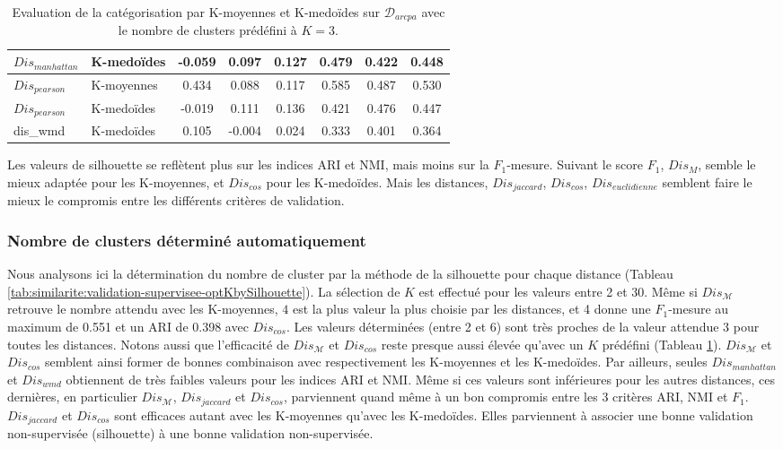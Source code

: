 \begin{table}[!htb]
\begin{tabular}[pos]{|l|l|c|c|c|c|c|c|}
		 $Dis_{manhattan}$  & K-medoïdes  & -0.059     & 0.097 & 0.127 & 0.479  & 0.422     & 0.448 \\ \hline
		 $Dis_{pearson}$    & K-moyennes    & 0.434      & 0.088 & 0.117 & 0.585  & 0.487     & 0.530 \\ \hline
		 $Dis_{pearson}$    & K-medoïdes  & -0.019     & 0.111 & 0.136 & 0.421  & 0.476     & 0.447 \\ \hline
		 dis\_wmd    & K-medoïdes  & 0.105 & -0.004&	0.024&	0.333&	0.401&	0.364 \\ \hline
	\end{tabular}
	\caption{Evaluation de la catégorisation par K-moyennes et K-medoïdes sur $\mathcal{D}_{arcpa}$ avec le nombre de clusters prédéfini à $K=3$.} \label{tab:similarite:validation-supervisee-k3}
\end{table}

Les valeurs de silhouette se reflètent plus sur les indices ARI et NMI, mais moins sur la $F_1$-mesure. Suivant le score $F_1$, $Dis_M$, semble le mieux adaptée pour les K-moyennes, et $Dis_{cos}$ pour les K-medoïdes. Mais les distances, $Dis_{jaccard}$, $Dis_{cos}$, $Dis_{euclidienne}$ semblent faire le mieux le compromis entre les différents critères de validation.


\subsubsection{Nombre de clusters déterminé automatiquement}
Nous analysons ici  la détermination du nombre de cluster par la méthode de la silhouette pour chaque distance (Tableau \ref{tab:similarite:validation-supervisee-optKbySilhouette}). La sélection de $K$ est effectué pour les valeurs entre 2 et 30. Même si $Dis_\mathcal{M}$ retrouve le nombre attendu avec les K-moyennes, $4$ est la plus valeur la plus choisie par les distances, et 4 donne une $F_1$-mesure au maximum de 0.551 et un ARI de 0.398 avec $Dis_{cos}$. Les valeurs déterminées (entre 2 et 6) sont très proches de la valeur attendue 3 pour toutes les distances.  Notons aussi que l'efficacité de $Dis_\mathcal{M}$ et $Dis_{cos}$ reste presque aussi élevée qu'avec un $K$ prédéfini (Tableau \ref{tab:similarite:validation-supervisee-k3}). $Dis_\mathcal{M}$ et $Dis_{cos}$ semblent ainsi former de bonnes combinaison avec respectivement les K-moyennes et les K-medoïdes. Par ailleurs, seules $Dis_{manhattan}$ et $Dis_{wmd}$ obtiennent de très faibles valeurs pour les indices ARI et NMI. Même si ces valeurs sont inférieures pour les autres distances, ces dernières, en particulier $Dis_\mathcal{M}$, $Dis_{jaccard}$ et $Dis_{cos}$, parviennent quand même à un bon compromis entre les 3 critères ARI, NMI et $F_1$. $Dis_{jaccard}$ et $Dis_{cos}$ sont efficaces autant avec les K-moyennes qu'avec les K-medoïdes. Elles parviennent à associer une bonne validation non-supervisée (silhouette) à une bonne validation non-supervisée.

